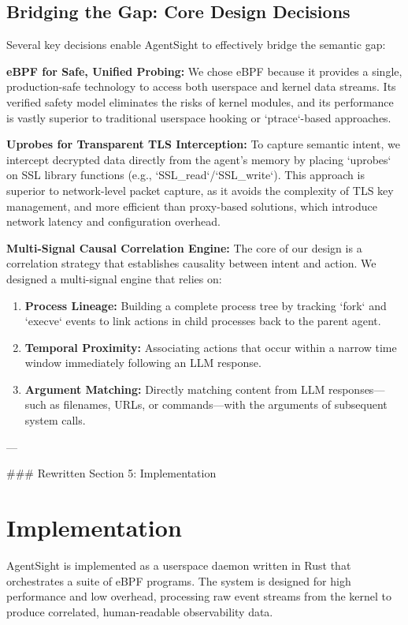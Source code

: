 \subsection{Bridging the Gap: Core Design Decisions}
Several key decisions enable AgentSight to effectively bridge the semantic gap:

\textbf{eBPF for Safe, Unified Probing:} We chose eBPF because it provides a single, production-safe technology to access both userspace and kernel data streams. Its verified safety model eliminates the risks of kernel modules, and its performance is vastly superior to traditional userspace hooking or `ptrace`-based approaches.

\textbf{Uprobes for Transparent TLS Interception:} To capture semantic intent, we intercept decrypted data directly from the agent's memory by placing `uprobes` on SSL library functions (e.g., `SSL_read`/`SSL_write`). This approach is superior to network-level packet capture, as it avoids the complexity of TLS key management, and more efficient than proxy-based solutions, which introduce network latency and configuration overhead.

\textbf{Multi-Signal Causal Correlation Engine:} The core of our design is a correlation strategy that establishes causality between intent and action. We designed a multi-signal engine that relies on:
\begin{enumerate}
    \item \textbf{Process Lineage:} Building a complete process tree by tracking `fork` and `execve` events to link actions in child processes back to the parent agent.
    \item \textbf{Temporal Proximity:} Associating actions that occur within a narrow time window immediately following an LLM response.
    \item \textbf{Argument Matching:} Directly matching content from LLM responses—such as filenames, URLs, or commands—with the arguments of subsequent system calls.
\end{enumerate}

---

### Rewritten Section 5: Implementation

\section{Implementation}
AgentSight is implemented as a userspace daemon written in Rust that orchestrates a suite of eBPF programs. The system is designed for high performance and low overhead, processing raw event streams from the kernel to produce correlated, human-readable observability data.

